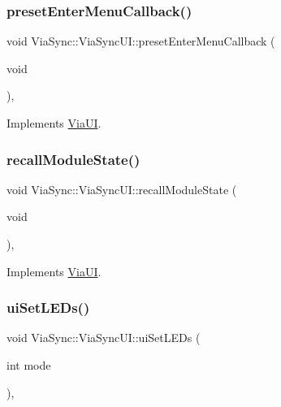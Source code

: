 \subsubsection{\texorpdfstring{preset\+Enter\+Menu\+Callback()}{presetEnterMenuCallback()}}
{\footnotesize\ttfamily void Via\+Sync\+::\+Via\+Sync\+U\+I\+::preset\+Enter\+Menu\+Callback (\begin{DoxyParamCaption}\item[{void}]{ }\end{DoxyParamCaption})\hspace{0.3cm}{\ttfamily [override]}, {\ttfamily [virtual]}}



Implements \mbox{\hyperlink{class_via_u_i_ad4dfd9fa424267358cab83bec4ee1f23}{Via\+UI}}.

\mbox{\label{class_via_sync_1_1_via_sync_u_i_a1a59cd903a2e11b698445b02c9fe5a48}} 
\subsubsection{\texorpdfstring{recall\+Module\+State()}{recallModuleState()}}
{\footnotesize\ttfamily void Via\+Sync\+::\+Via\+Sync\+U\+I\+::recall\+Module\+State (\begin{DoxyParamCaption}\item[{void}]{ }\end{DoxyParamCaption})\hspace{0.3cm}{\ttfamily [override]}, {\ttfamily [virtual]}}



Implements \mbox{\hyperlink{class_via_u_i_ac5b88708650fe41ea955c77de580f6f5}{Via\+UI}}.

\mbox{\label{class_via_sync_1_1_via_sync_u_i_a694877fa6ee36aa11d9fbf3e249f95e5}} 
\subsubsection{\texorpdfstring{ui\+Set\+L\+E\+Ds()}{uiSetLEDs()}}
{\footnotesize\ttfamily void Via\+Sync\+::\+Via\+Sync\+U\+I\+::ui\+Set\+L\+E\+Ds (\begin{DoxyParamCaption}\item[{int}]{mode }\end{DoxyParamCaption})\hspace{0.3cm}{\ttfamily [override]}, {\ttfamily [virtual]}}



